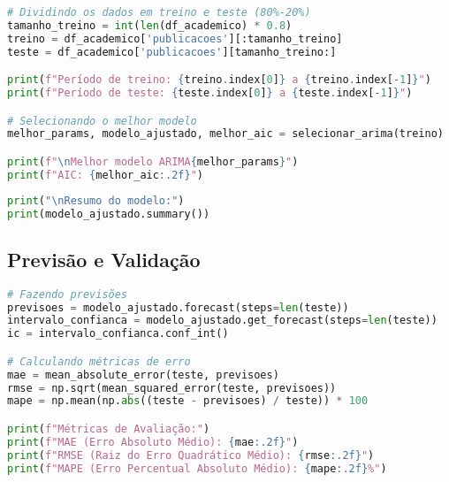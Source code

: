 \begin{pythonbox}
\begin{lstlisting}[language=Python]
# Dividindo os dados em treino e teste (80%-20%)
tamanho_treino = int(len(df_academico) * 0.8)
treino = df_academico['publicacoes'][:tamanho_treino]
teste = df_academico['publicacoes'][tamanho_treino:]

print(f"Período de treino: {treino.index[0]} a {treino.index[-1]}")
print(f"Período de teste: {teste.index[0]} a {teste.index[-1]}")

# Selecionando o melhor modelo
melhor_params, modelo_ajustado, melhor_aic = selecionar_arima(treino)

print(f"\nMelhor modelo ARIMA{melhor_params}")
print(f"AIC: {melhor_aic:.2f}")
\end{lstlisting}
\end{pythonbox}

\begin{pythonbox}
\begin{lstlisting}[language=Python]
print("\nResumo do modelo:")
print(modelo_ajustado.summary())
\end{lstlisting}
\end{pythonbox}

\subsection{Previsão e Validação}

\begin{pythonbox}
\begin{lstlisting}[language=Python]
# Fazendo previsões
previsoes = modelo_ajustado.forecast(steps=len(teste))
intervalo_confianca = modelo_ajustado.get_forecast(steps=len(teste))
ic = intervalo_confianca.conf_int()

# Calculando métricas de erro
mae = mean_absolute_error(teste, previsoes)
rmse = np.sqrt(mean_squared_error(teste, previsoes))
mape = np.mean(np.abs((teste - previsoes) / teste)) * 100

print(f"Métricas de Avaliação:")
print(f"MAE (Erro Absoluto Médio): {mae:.2f}")
print(f"RMSE (Raiz do Erro Quadrático Médio): {rmse:.2f}")
print(f"MAPE (Erro Percentual Absoluto Médio): {mape:.2f}%")
\end{lstlisting}
\end{pythonbox}


